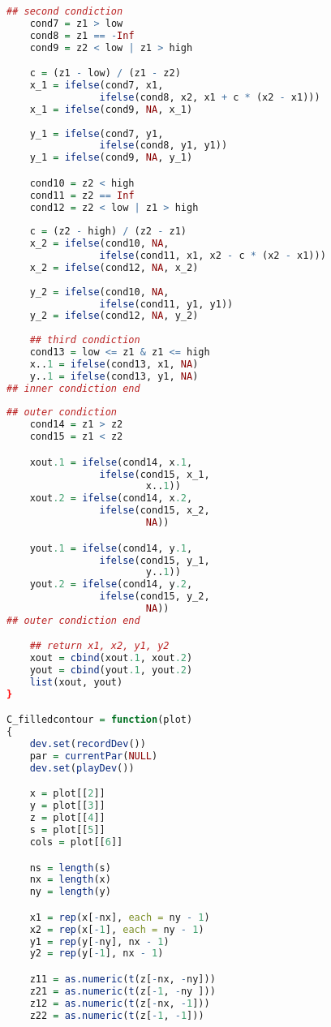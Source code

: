 \begin{lstlisting}[language = R]
    ## second condiction
    cond7 = z1 > low
    cond8 = z1 == -Inf
    cond9 = z2 < low | z1 > high

    c = (z1 - low) / (z1 - z2)
    x_1 = ifelse(cond7, x1, 
                ifelse(cond8, x2, x1 + c * (x2 - x1)))
    x_1 = ifelse(cond9, NA, x_1)
                
    y_1 = ifelse(cond7, y1, 
                ifelse(cond8, y1, y1))
    y_1 = ifelse(cond9, NA, y_1)

    cond10 = z2 < high
    cond11 = z2 == Inf
    cond12 = z2 < low | z1 > high
                
    c = (z2 - high) / (z2 - z1)
    x_2 = ifelse(cond10, NA, 
                ifelse(cond11, x1, x2 - c * (x2 - x1)))
    x_2 = ifelse(cond12, NA, x_2)
                
    y_2 = ifelse(cond10, NA, 
                ifelse(cond11, y1, y1))
    y_2 = ifelse(cond12, NA, y_2)
                
    ## third condiction
    cond13 = low <= z1 & z1 <= high
    x..1 = ifelse(cond13, x1, NA)
    y..1 = ifelse(cond13, y1, NA)
## inner condiction end
    
## outer condiction 
    cond14 = z1 > z2
    cond15 = z1 < z2

    xout.1 = ifelse(cond14, x.1,
                ifelse(cond15, x_1,
                        x..1))
    xout.2 = ifelse(cond14, x.2,
                ifelse(cond15, x_2,
                        NA))						

    yout.1 = ifelse(cond14, y.1,
                ifelse(cond15, y_1,
                        y..1))
    yout.2 = ifelse(cond14, y.2,
                ifelse(cond15, y_2,
                        NA))			
## outer condiction end

    ## return x1, x2, y1, y2
    xout = cbind(xout.1, xout.2)
    yout = cbind(yout.1, yout.2)
    list(xout, yout)
}

C_filledcontour = function(plot)
{
    dev.set(recordDev())
    par = currentPar(NULL)
    dev.set(playDev())

    x = plot[[2]]
    y = plot[[3]]
    z = plot[[4]]
    s = plot[[5]]
    cols = plot[[6]]

    ns = length(s)
    nx = length(x)
    ny = length(y)

    x1 = rep(x[-nx], each = ny - 1)
    x2 = rep(x[-1], each = ny - 1)
    y1 = rep(y[-ny], nx - 1)
    y2 = rep(y[-1], nx - 1)

    z11 = as.numeric(t(z[-nx, -ny]))
    z21 = as.numeric(t(z[-1, -ny ]))
    z12 = as.numeric(t(z[-nx, -1]))
    z22 = as.numeric(t(z[-1, -1]))


\end{lstlisting}
